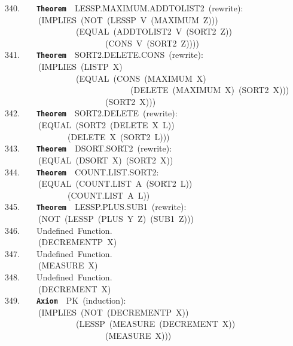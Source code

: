 \documentclass[11pt]{book}
\newenvironment{pubasis}{\begin{flushleft}\ttfamily\small}{\normalsize\rmfamily\end{flushleft}}
\newcommand{\axiomordefinition}[1]{\vspace{6pt}\texttt{\textbf{#1}}}
\begin{document}
\begin{pubasis}
340.~~~~\axiomordefinition{Theorem}~~LESSP.MAX\-I\-MUM.ADD\-TO\-LIST2~(rewrite):\\
~~~~~~~~(IMPLIES~(NOT~(LESSP~V~(MAXIMUM~Z)))\\
~~~~~~~~~~~~~~~~~(EQUAL~(ADDTOLIST2~V~(SORT2~Z))\\
~~~~~~~~~~~~~~~~~~~~~~~~(CONS~V~(SORT2~Z))))\\

341.~~~~\axiomordefinition{Theorem}~~SORT2.DELETE.CONS~(rewrite):\\
~~~~~~~~(IMPLIES~(LISTP~X)\\
~~~~~~~~~~~~~~~~~(EQUAL~(CONS~(MAXIMUM~X)\\
~~~~~~~~~~~~~~~~~~~~~~~~~~~~~~(DELETE~(MAXIMUM~X)~(SORT2~X)))\\
~~~~~~~~~~~~~~~~~~~~~~~~(SORT2~X)))\\

342.~~~~\axiomordefinition{Theorem}~~SORT2.DELETE~(rewrite):\\
~~~~~~~~(EQUAL~(SORT2~(DELETE~X~L))\\
~~~~~~~~~~~~~~~(DELETE~X~(SORT2~L)))\\

343.~~~~\axiomordefinition{Theorem}~~DSORT.SORT2~(rewrite):\\
~~~~~~~~(EQUAL~(DSORT~X)~(SORT2~X))\\

344.~~~~\axiomordefinition{Theorem}~~COUNT.LIST.SORT2:\\
~~~~~~~~(EQUAL~(COUNT.LIST~A~(SORT2~L))\\
~~~~~~~~~~~~~~~(COUNT.LIST~A~L))\\

345.~~~~\axiomordefinition{Theorem}~~LESSP.PLUS.SUB1~(rewrite):\\
~~~~~~~~(NOT~(LESSP~(PLUS~Y~Z)~(SUB1~Z)))\\

346.~~~~Undefined~Function.\\
~~~~~~~~(DECREMENTP~X)\\

347.~~~~Undefined~Function.\\
~~~~~~~~(MEASURE~X)\\

348.~~~~Undefined~Function.\\
~~~~~~~~(DECREMENT~X)\\

349.~~~~\axiomordefinition{Axiom}~~PK~(induction):\\
~~~~~~~~(IMPLIES~(NOT~(DECREMENTP~X))\\
~~~~~~~~~~~~~~~~~(LESSP~(MEASURE~(DECREMENT~X))\\
~~~~~~~~~~~~~~~~~~~~~~~~(MEASURE~X)))\\


\end{pubasis}
\end{document}
